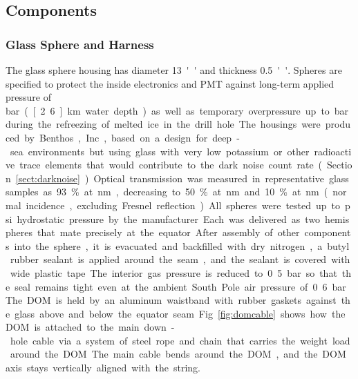 \subsection{\label{sec:dom_components} Components}

\subsubsection{\label{sec:sphere}Glass Sphere and Harness}

The glass sphere housing has diameter \SI{13}{''} and thickness \SI{0.5}{''}.
Spheres are specified to protect the inside electronics and PMT against long-term applied pressure of 
\unit[250]bar (\unit[2.6]km water depth)
as well as temporary overpressure up to \unit[690]bar during the refreezing of melted ice in the drill hole.
The housings were produced by Benthos, Inc., based on a design for deep-sea environments but using glass
with very low potassium or other radioactive trace elements that would contribute to the dark noise
count rate (Section~\ref{sect:darknoise}).  
Optical transmission was measured in representative glass samples as 93\% at \unit[400]nm,
decreasing to 50\% at \unit[340]nm and 10\% at \unit[315]nm (normal incidence, excluding Fresnel reflection).


All spheres were tested up to \unit[10,000]psi hydrostatic pressure by the manufacturer.
Each was delivered as two hemispheres that mate precisely at the equator.
After assembly of other components into the sphere, it is evacuated and backfilled with dry nitrogen,
a butyl rubber sealant is applied around the seam, and the sealant is covered with wide plastic tape.
The interior gas pressure is reduced to 0.5 bar so that the seal remains tight even
at the ambient South Pole air pressure of 0.6 bar.

The DOM is held by an aluminum waistband with rubber gaskets against
the glass above and below the equator seam. 
Fig.~\ref{fig:domcable} shows how the DOM is attached to the main down-hole cable via a system
of steel rope and chain that carries the weight load around the DOM.
The main cable bends around the DOM, and the DOM axis stays vertically aligned with the string.

